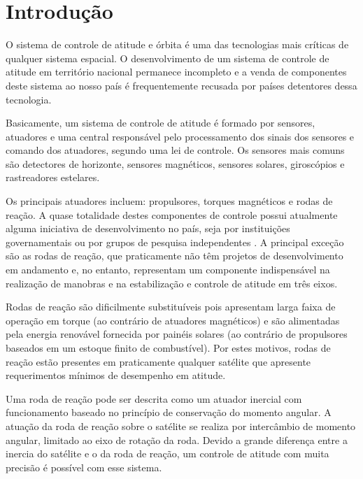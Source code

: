 \cleardoublepage

\pagestyle{fancy}


\chapter{Introdução}\label{intro}

O sistema de controle de atitude e órbita é uma das tecnologias mais críticas de qualquer sistema espacial. O desenvolvimento de um sistema de controle de atitude em território nacional permanece incompleto \citep{Veloso2009} e a venda de componentes deste sistema ao nosso país é frequentemente recusada por países detentores dessa tecnologia.

Basicamente, um sistema de controle de atitude é formado por sensores, atuadores e uma central responsável pelo processamento dos sinais dos sensores e comando dos atuadores, segundo uma lei de controle. Os sensores mais comuns são detectores de horizonte, sensores magnéticos, sensores solares, giroscópios e rastreadores estelares. 

Os principais atuadores incluem: propulsores, torques magnéticos e rodas de reação. A quase totalidade destes componentes de controle possui atualmente alguma iniciativa de desenvolvimento no país, seja por instituições governamentais ou por grupos de pesquisa independentes \citep{PresidenciaRepublica}. A principal exceção são as rodas de reação, que praticamente não têm projetos de desenvolvimento em andamento e, no entanto, representam um componente indispensável na realização de manobras e na estabilização e controle de atitude em três eixos. 

Rodas de reação são dificilmente substituíveis pois apresentam larga faixa de operação em torque (ao contrário de atuadores magnéticos) e são alimentadas pela energia renovável fornecida por painéis solares (ao contrário de propulsores baseados em um estoque finito de combustível). Por estes motivos, rodas de reação estão presentes em praticamente qualquer satélite que apresente requerimentos mínimos de desempenho em atitude.

Uma roda de reação pode ser descrita como um atuador inercial com funcionamento baseado no princípio de conservação do momento angular. A atuação da roda de reação sobre o satélite se realiza por intercâmbio de momento angular, limitado ao eixo de rotação da roda. Devido a grande diferença entre a inercia do satélite e o da roda de reação, um controle de atitude com muita precisão é possível com esse sistema.

